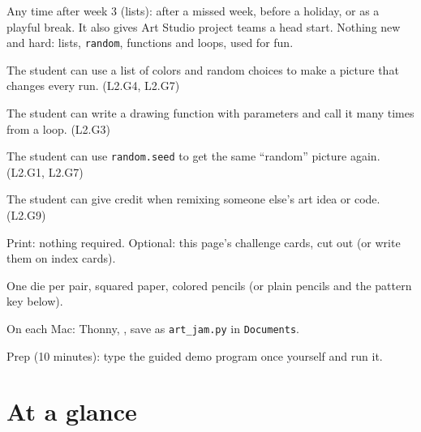 
\begin{teachernote}
Any time after week 3 (lists): after a missed week, before a holiday, or as a playful break. It
also gives Art Studio project teams a head start. Nothing new and hard: lists, \texttt{random},
functions and loops, used for fun.
\end{teachernote}

\begin{objectives}
  \item The student can use a list of colors and random choices to make a picture that changes every run. (L2.G4, L2.G7)
  \item The student can write a drawing function with parameters and call it many times from a loop. (L2.G3)
  \item The student can use \texttt{random.seed} to get the same \enquote{random} picture again. (L2.G1, L2.G7)
  \item The student can give credit when remixing someone else's art idea or code. (L2.G9)
\end{objectives}

\begin{materials}
  \item Print: nothing required. Optional: this page's challenge cards, cut out (or write them on index cards).
  \item One die per pair, squared paper, colored pencils (or plain pencils and the pattern key below).
  \item On each Mac: Thonny, , save as \texttt{art\_jam.py} in \texttt{Documents}.
  \item Prep (10 minutes): type the guided demo program once yourself and run it.
\end{materials}

\section{At a glance}
\begin{timeplan}
\end{timeplan}

